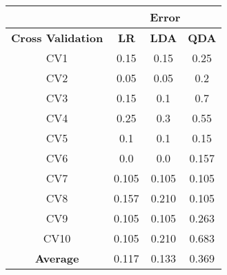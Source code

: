 \begin{center}
    \begin{tabular}{|c|c|c|c|}
        \hline
            \multicolumn{1}{|r|}{} & \multicolumn{3}{|c|}{Error} \\
        \hline
        \textbf{Cross Validation} & \textbf{LR} & \textbf{LDA} & \textbf{QDA} \\
        \hline
        CV1 & 0.15 & 0.15 & 0.25 \\
        \hline
        CV2 & 0.05 & 0.05 & 0.2 \\
        \hline
        CV3 & 0.15 & 0.1 & 0.7 \\
        \hline 
        CV4 & 0.25 & 0.3 & 0.55 \\
        \hline 
        CV5 & 0.1 & 0.1 & 0.15 \\
        \hline
        CV6 & 0.0 & 0.0 & 0.157 \\
        \hline 
        CV7 & 0.105 & 0.105 & 0.105 \\
        \hline 
        CV8 & 0.157 & 0.210 & 0.105 \\
        \hline
        CV9 & 0.105 & 0.105 & 0.263 \\
        \hline
        CV10 & 0.105 & 0.210 & 0.683 \\
        \hline
        \textbf{Average} & 0.117 & 0.133 & 0.369 \\
        \hline
    \end{tabular}
\end{center}
